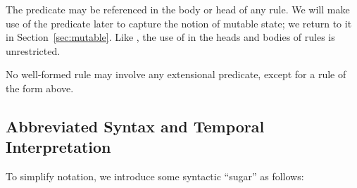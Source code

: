 The predicate  may be referenced in the body or head of any \lang rule.  
We will make use of the predicate  later to capture the notion of mutable state; we return to it in Section~\ref{sec:mutable}. 
Like , the use of  in the heads and bodies of rules is unrestricted.

\vspace{1.2em}
No well-formed \lang rule may involve any extensional predicate, except for a rule of the form above.

\subsection{Abbreviated Syntax and Temporal Interpretation}

\label{sec:abbrvsyntax}



To simplify \lang notation, we introduce some syntactic ``sugar'' as follows:

